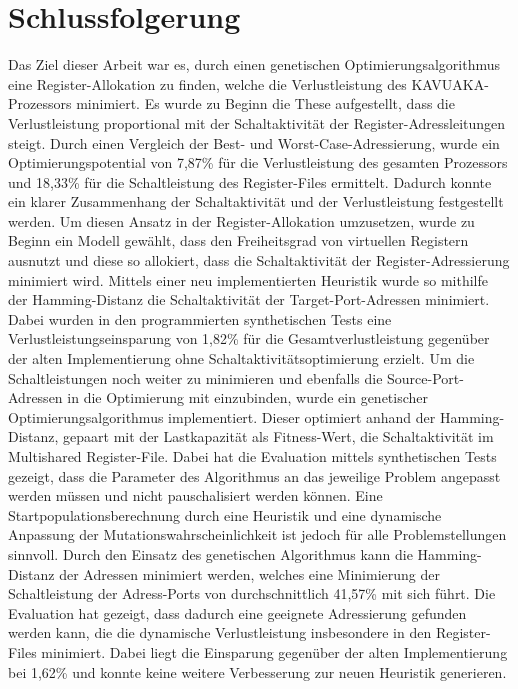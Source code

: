 \chapter{Schlussfolgerung}
\label{chap:schlussfolgerung}
Das Ziel dieser Arbeit war es, durch einen genetischen Optimierungsalgorithmus eine Register-Allokation zu finden, welche die Verlustleistung des KAVUAKA-Prozessors minimiert. Es wurde zu Beginn die These aufgestellt, dass die Verlustleistung proportional mit der Schaltaktivität der Register-Adressleitungen steigt. Durch einen Vergleich der Best- und Worst-Case-Adressierung, wurde ein Optimierungspotential von 7,87\% für die Verlustleistung des gesamten Prozessors und 18,33\% für die Schaltleistung des Register-Files ermittelt. Dadurch konnte ein klarer Zusammenhang der Schaltaktivität und der Verlustleistung festgestellt werden. Um diesen Ansatz in der Register-Allokation umzusetzen, wurde zu Beginn ein Modell gewählt, dass den Freiheitsgrad von virtuellen Registern ausnutzt und diese so allokiert, dass die Schaltaktivität der Register-Adressierung minimiert wird. Mittels einer neu implementierten Heuristik wurde so mithilfe der Hamming-Distanz die Schaltaktivität der Target-Port-Adressen minimiert. Dabei wurden in den programmierten synthetischen Tests eine Verlustleistungseinsparung von 1,82\% für die Gesamtverlustleistung gegenüber der alten Implementierung ohne Schaltaktivitätsoptimierung erzielt.
Um die Schaltleistungen noch weiter zu minimieren und ebenfalls die Source-Port-Adressen in die Optimierung mit einzubinden, wurde ein genetischer Optimierungsalgorithmus implementiert. Dieser optimiert anhand der Hamming-Distanz, gepaart mit der Lastkapazität als Fitness-Wert, die Schaltaktivität im Multishared Register-File. Dabei hat die Evaluation mittels synthetischen Tests gezeigt, dass die Parameter des Algorithmus an das jeweilige Problem angepasst werden müssen und nicht pauschalisiert werden können. Eine Startpopulationsberechnung durch eine Heuristik und eine dynamische Anpassung der Mutationswahrscheinlichkeit ist jedoch für alle Problemstellungen sinnvoll.
Durch den Einsatz des genetischen Algorithmus kann die Hamming-Distanz der Adressen minimiert werden, welches eine Minimierung der Schaltleistung der Adress-Ports von durchschnittlich 41,57\% mit sich führt.  
Die Evaluation hat gezeigt, dass dadurch eine geeignete Adressierung gefunden werden kann, die die dynamische Verlustleistung insbesondere in den Register-Files minimiert. Dabei liegt die Einsparung gegenüber der alten Implementierung bei 1,62\% und konnte keine weitere Verbesserung zur neuen Heuristik generieren.
